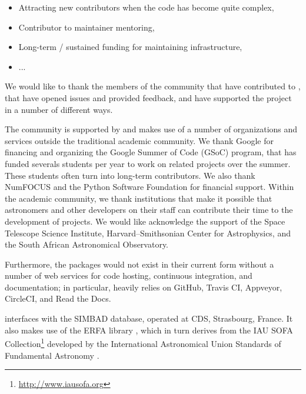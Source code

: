 \documentclass[modern]{aastex631}
\begin{document}
\begin{itemize}
\item Attracting new contributors when the code has become quite complex,
\item Contributor to maintainer mentoring,
\item Long-term / sustained funding for maintaining infrastructure,
\item ...
\end{itemize}


\begin{acknowledgments}

We would like to thank the members of the community that have contributed to
\astropy, that have opened issues and provided feedback, and have supported the
project in a number of different ways.

The \astropy community is supported by and makes use
of a number of organizations and services outside the traditional
academic community. We thank Google for financing and organizing the
Google Summer of Code (GSoC) program, that has funded severals
students per year to work on \astropy related projects over the
summer. These students often turn into long-term contributors. We also
thank NumFOCUS and the Python Software Foundation for financial
support. Within the academic community, we thank
institutions that make it possible that astronomers and other developers on
their staff can contribute their time to the development of
\astropy projects.  We would like acknowledge the support of the
Space Telescope Science Institute, Harvard--Smithsonian Center for Astrophysics,
and the South African Astronomical Observatory.

Furthermore, the \astropy packages would not exist in their current form without
a number of web services for code hosting, continuous integration, and
documentation; in particular, \astropy heavily relies on GitHub, Travis CI,
Appveyor, CircleCI, and Read the Docs.

\astropypkg interfaces with the SIMBAD database, operated at CDS, Strasbourg,
France. It also makes use of the ERFA library \citep{erfa}, which in turn
derives from the IAU SOFA Collection\footnote{\url{http://www.iausofa.org}}
developed by the International Astronomical Union Standards of Fundamental
Astronomy \citep{sofa}.

\end{acknowledgments}

\end{document}
